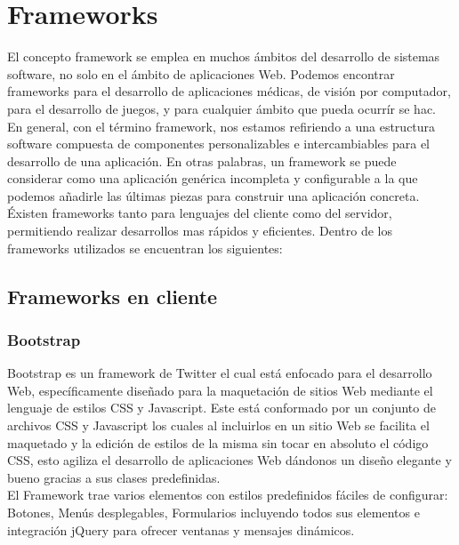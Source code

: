 \section{Frameworks}

El concepto framework se emplea en muchos \'ambitos del desarrollo de sistemas software, no solo en el \'ambito de aplicaciones Web. Podemos encontrar frameworks para el desarrollo de aplicaciones m\'edicas, de visi\'on por computador, para el desarrollo de juegos, y para cualquier \'ambito que pueda ocurr\'ir se hac.\\

En general, con el t\'ermino framework, nos estamos refiriendo a una estructura software compuesta de componentes personalizables e intercambiables para el desarrollo de una aplicaci\'on. En otras palabras, un framework se puede considerar como una aplicaci\'on gen\'erica incompleta y configurable a la que podemos a\~nadirle las \'ultimas piezas para construir una aplicaci\'on concreta.\\

\'Existen frameworks tanto para lenguajes del cliente como del servidor, permitiendo realizar desarrollos mas rápidos y eficientes. Dentro de los frameworks utilizados se encuentran los siguientes:




\subsection{Frameworks en cliente}

	\subsubsection{Bootstrap}

		Bootstrap es un framework de Twitter el cual est\'a enfocado para el desarrollo Web, espec\'ificamente dise\~nado para la maquetaci\'on de sitios Web mediante  el lenguaje de estilos CSS y Javascript. Este est\'a conformado por un conjunto de archivos CSS y Javascript los cuales al incluirlos en un sitio Web se facilita el maquetado y la edici\'on de estilos de la misma sin tocar en absoluto el c\'odigo CSS, esto agiliza el desarrollo de aplicaciones Web d\'andonos un dise\~no elegante y bueno gracias a sus clases predefinidas.\\

		El Framework trae varios elementos con estilos predefinidos f\'aciles de configurar: Botones, Men\'us desplegables, Formularios incluyendo todos sus elementos e integraci\'on jQuery para ofrecer ventanas y mensajes din\'amicos.\\

